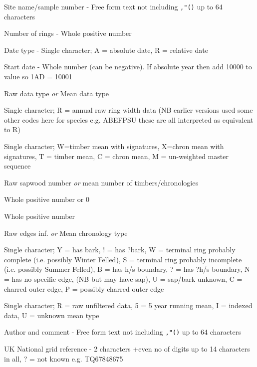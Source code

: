 \documentclass[10pt, headsepline,DIV14,BCOR0.5cm]{scrreprt}
\begin{document}
\begin{enumerate*}
 \item Site name/sample number - Free form text not including \verb|,"()| up to 64 characters 
 \item Number of rings - Whole positive number 
 \item Date type - Single character; A = absolute date, R = relative date 
 \item Start date - Whole number (can be negative).  If absolute year then add 10000 to value so 1AD = 10001
 \item Raw data type \emph{or} Mean data type 
      \begin{itemize*}   
       \item Single character; R = annual raw ring width data (NB earlier versions used some other codes here for species e.g. ABEFPSU these are all interpreted as equivalent to R) 
       \item Single character; W=timber mean with signatures, X=chron mean with signatures, T = timber mean, C = chron mean, M = un-weighted master sequence 
      \end{itemize*} 
 \item Raw sapwood number \emph{or} mean number of timbers/chronologies
      \begin{itemize*}   
       \item Whole positive number or 0 
       \item Whole positive number
      \end{itemize*} 
 \item Raw edges inf. \emph{or} Mean chronology type
      \begin{itemize*}   
       \item Single character; Y = has bark, ! = has ?bark, W = terminal ring probably complete (i.e. possibly Winter Felled), S = terminal ring probably incomplete (i.e. possibly Summer Felled), B = has h/s boundary, ? = has ?h/s boundary, N = has no specific edge, (NB but may have sap), U = sap/bark unknown, C = charred outer edge, P = possibly charred outer edge 
       \item Single character; R = raw unfiltered data, 5 = 5 year running mean, I = indexed data, U = unknown mean type 
      \end{itemize*} 
 \item Author and comment - Free form text not including \verb|,"()| up to 64 characters 
 \item UK National grid reference - 2 characters +even no of digits up to 14 characters in all, ? = not known e.g. TQ67848675

\end{enumerate*}
\end{document}
